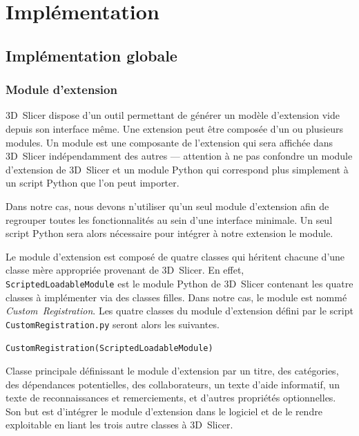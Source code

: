 \documentclass{article}
\newcommand{\method}[1]{\hspace{1in}\texttt{#1}\bigskip}
\begin{document}
{
    \section{Implémentation}
    \label{sec:implementation}

    {
        \bigskip
        \subsection{Implémentation globale}
        \label{subsec:global-implementation}

        {
            \subsubsection{Module d'extension}
            \label{subsubsec:extension-module}

            3D~Slicer dispose d'un outil permettant de générer un modèle d'extension vide depuis son interface même. Une extension peut être composée d'un ou plusieurs modules. Un module est une composante de l'extension qui sera affichée dans 3D~Slicer indépendamment des autres --- attention à ne pas confondre un module d'extension de 3D~Slicer et un module Python qui correspond plus simplement à un script Python que l'on peut importer.

            Dans notre cas, nous devons n'utiliser qu'un seul module d'extension afin de regrouper toutes les fonctionnalités au sein d'une interface minimale. Un seul script Python sera alors nécessaire pour intégrer à notre extension le module.

            \bigskip

            Le module d'extension est composé de quatre classes qui héritent chacune d'une classe mère appropriée provenant de 3D~Slicer. En effet, \texttt{ScriptedLoadableModule} est le module Python de 3D~Slicer contenant les quatre classes à implémenter via des classes filles. Dans notre cas, le module est nommé \textit{Custom~Registration}. Les quatre classes du module d'extension défini par le script \texttt{CustomRegistration.py} seront alors les suivantes.

            \bigskip
            \method{CustomRegistration(ScriptedLoadableModule)}

            Classe principale définissant le module d'extension par un titre, des catégories, des dépendances potentielles, des collaborateurs, un texte d'aide informatif, un texte de reconnaissances et remerciements, et d'autres propriétés optionnelles. Son but est d'intégrer le module d'extension dans le logiciel et de le rendre exploitable en liant les trois autre classes à 3D~Slicer.

}}}
\end{document}
